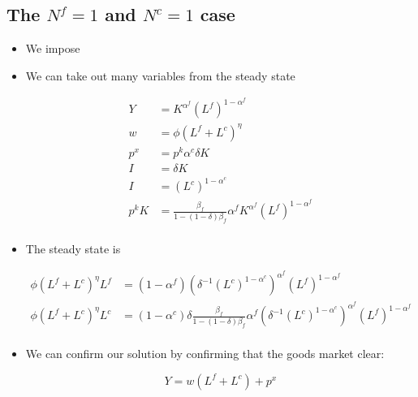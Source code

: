 \documentclass[11pt]{article}
\numberwithin{equation}{section}
\begin{document}
\subsection{The $N^f=1$ and $N^c=1$ case}

\begin{itemize}
	
	\item We impose
	\item We can take out many variables from the steady state 
	
		\begin{align*}
		Y & =  	K^{\alpha^f} \left(L^f\right)^{1-\alpha^f} \\
		w  & = \phi \left(L^f+L^c\right)^{\eta}\\
		p^x & = p^k  \alpha^c \delta K  \\
		I & = \delta K\\
		I & = \left(L^c\right)^{1-\alpha^c}\\
	p^k K & =\frac{\beta_f}{1-(1-\delta)\beta_f}  \alpha^f K^{\alpha^f} \left(L^f\right)^{1-\alpha^f}  \\ 
	\end{align*}
	
	\item The steady state is
	
		
	\begin{align*}
	\phi \left(L^f+L^c\right)^{\eta} L^f  & =  (1-\alpha^f) \left(\delta^{-1}\left(L^c\right)^{1-\alpha^c}\right)^{\alpha^f} \left(L^f\right)^{1-\alpha^f}  \\
	\phi \left(L^f+L^c\right)^{\eta} L^c  & =  (1-\alpha^c)\delta \frac{\beta_f}{1-(1-\delta)\beta_f}  \alpha^f  \left(\delta^{-1}\left(L^c\right)^{1-\alpha^c}\right)^{\alpha^f} \left(L^f\right)^{1-\alpha^f} \\
	\end{align*}
	
	\item We can confirm our solution by confirming that the goods market clear:
	
	  $$Y  =  w \left(L^f+L^c\right) + p^x $$
\end{itemize}
\end{document}
